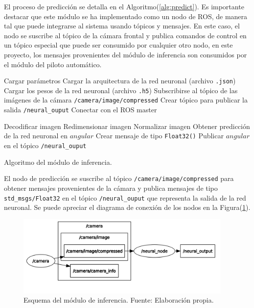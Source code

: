     El proceso de predicción se detalla en el Algoritmo(\ref{alg:predict}). Es importante destacar que este módulo se ha implementado como 
    un nodo de ROS, de manera tal que puede integrarse al sistema usando tópicos y mensajes. En este caso, el nodo se 
    suscribe al tópico de la cámara frontal y publica comandos de control en un tópico especial que puede ser consumido por 
    cualquier otro nodo, en este proyecto, los mensajes provenientes del módulo de inferencia son consumidos por el módulo 
    del piloto automático. 

    \begin{algorithm}
        \begin{algorithmic}[1]
        \STATE Cargar parámetros 
        \STATE Cargar la arquitectura de la red neuronal (archivo \lstinline{.json}) 
        \STATE Cargar los pesos de la red neuronal (archivo \lstinline{.h5})
        \STATE Subscribirse al tópico de las imágenes de la cámara \lstinline{/camera/image/compressed}
        \STATE Crear tópico para publicar la salida \lstinline{/neural_ouput}
        \STATE Conectar con el ROS master
        
                \STATE Decodificar imagen 
                \STATE Redimensionar imagen 
                \STATE Normalizar imagen 
                \STATE Obtener predicción de la red neuronal en $angular$
                \STATE Crear mensaje de tipo \lstinline{Float32()}
                \STATE Publicar $angular$ en el tópico \lstinline{/neural_ouput}
            \ENDIF
        \ENDWHILE
        \end{algorithmic}
        \caption{Algoritmo del módulo de inferencia.}\label{alg:predict}
    \end{algorithm}

    El nodo de predicción se suscribe al tópico \lstinline{/camera/image/compressed} para obtener mensajes provenientes de 
    la cámara y publica mensajes de tipo \lstinline{std_msgs/Float32} en el tópico \lstinline{/neural_ouput} que representa 
    la salida de la red neuronal. Se puede apreciar el diagrama de conexión de los nodos en la Figura(\ref{fig:nodosneural}).

    \begin{figure}[!h] 
        \centering
        \includegraphics[width=0.95\textwidth]{img/nodosneural}
        \caption[Esquema del módulo de inferencia]{Esquema del módulo de inferencia. Fuente: Elaboración propia. }
        \label{fig:nodosneural}
    \end{figure}
    
